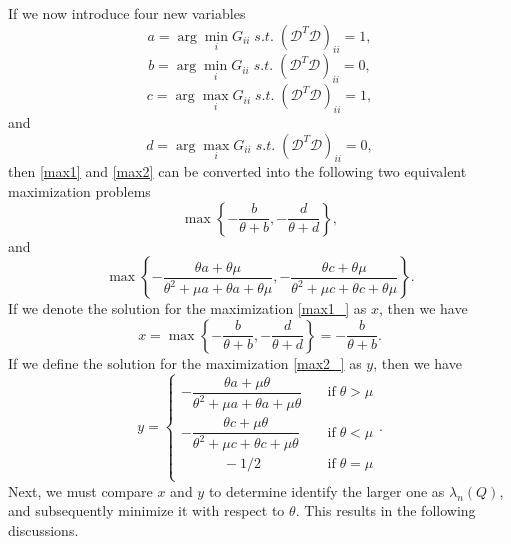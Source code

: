 \documentclass[letterpaper]{article} %
\begin{document}
If we now introduce four new variables
\begin{equation*}
a = \arg \min_i G_{ii} \; s.t. \; (\mathcal{D}^T\mathcal{D})_{ii} = 1,
\end{equation*}
\begin{equation*}
b = \arg \min_i G_{ii} \; s.t. \; (\mathcal{D}^T\mathcal{D})_{ii} = 0,
\end{equation*}
\begin{equation*}
c = \arg \max_i G_{ii} \; s.t. \; (\mathcal{D}^T\mathcal{D})_{ii} = 1,
\end{equation*}
and
\begin{equation*}
d = \arg \max_i G_{ii} \; s.t. \; (\mathcal{D}^T\mathcal{D})_{ii} = 0,
\end{equation*}
then \eqref{max1} and \eqref{max2} can be converted into the following two equivalent maximization problems
\begin{equation} \label{max1_}
    \max \left \{ -\frac{ b}{\theta+ b}, - \frac{d}{\theta + d}\right\} ,
\end{equation}
and
\begin{equation} \label{max2_}
    \max \left \{ -\frac{\theta a +\theta\mu }{\theta^2+\mu a+\theta a +\theta\mu }, -\frac{\theta c +\theta\mu }{\theta^2+\mu c+\theta c +\theta\mu }  \right\}.
\end{equation}
If we denote the solution for the maximization \eqref{max1_} as $x$, then we have
\begin{equation*} \label{x}
    x =  \max \left \{ -\frac{ b}{\theta+ b}, - \frac{d}{\theta + d}\right\}  =  -\frac{ b}{\theta+ b}.
\end{equation*}
If we define the solution for the maximization \eqref{max2_} as $y$, then we have
\begin{equation*} \label{y}
    y = \begin{cases}
  		-\dfrac{\theta a+\mu\theta}{\theta^2+\mu a+\theta a+\mu\theta}\quad & \text{if}\;\theta> \mu    \\
  		-\dfrac{\theta c+\mu\theta}{\theta^2+\mu c+\theta c+\mu\theta}\quad & \text{if}\;\theta<\mu \\
            \qquad \quad -1/2\quad & \text{if}\;\theta=\mu \\
  	\end{cases}.
\end{equation*}
Next, we must compare $x$ and $y$ to determine identify the larger one as $\lambda_n(Q)$, and subsequently minimize it with respect to $\theta$. This results in the following discussions.
\end{document}
